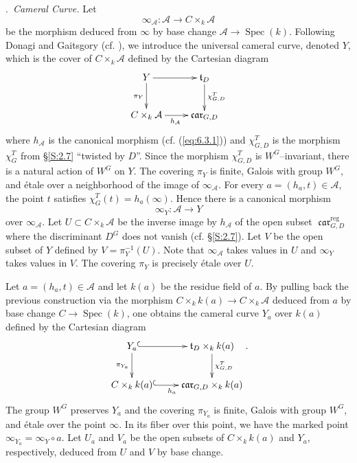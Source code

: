 \documentclass[12pt,a4paper,oneside,english,leqno]{smfart}
\makeatletter
\numberwithin{equation}{subsection}
\numberwithin{theo}{subsection}
\newenvironment{paragr}[1][]{\medskip\refstepcounter{subsection}%
  \par\noindent\hspace*{\parindent}\thesubsection.\ \emph{#1}%
  \@ifundefined{@empty}{}{}\ignorespaces}{\medskip}
\theoremstyle{plain}
\theoremstyle{definition}
\theoremstyle{remark}
\DeclareMathOperator{\reg}{reg}
\DeclareMathOperator{\Spec}{Spec}
\DeclareMathOperator{\car}{\mathfrak{car}}
\newcommand{\Ac}{\mathcal{A}}
\newcommand{\tgo}{\mathfrak{t}}
\makeatother
\begin{document}
\begin{paragr}[Cameral Curve.]\label{S:7.1} Let
$$\infty_\Ac : \Ac \to C\times_k \Ac$$
be the morphism deduced from $\infty$ by base change $\Ac\to \Spec(k)$. Following Donagi and Gaitsgory (cf. \cite{Donagi-Gaitsgory}), we introduce the universal cameral curve, denoted $Y$, which is the cover of $C\times_k \Ac$ defined by the Cartesian diagram
$$\xymatrix{
Y\ar[r]\ar[d]_{\pi_{Y}}&\tgo_{D}\ar[d]^{\chi^T_{G,D}}\\
C\times_k \Ac\ar[r]_{h_{\Ac}}&\car_{G,D}
}$$
where $h_\Ac$ is the canonical morphism (cf. (\ref{eq:6.3.1})) and $\chi^T_{G,D}$ is the morphism $\chi^T_G$ from §\ref{S:2.7} “twisted by $D$”. Since the morphism $\chi^T_{G,D}$ is $W^G$–invariant, there is a natural action of $W^G$ on $Y$. The covering $\pi_Y$ is finite, Galois with group $W^G$, and étale over a neighborhood of the image of $\infty_\Ac$. For every $a=(h_a,t)\in \Ac$, the point $t$ satisfies $\chi_G^T(t)=h_a(\infty)$. Hence there is a canonical morphism
$$\infty_Y : \Ac \to Y$$
over $\infty_\Ac$. Let $U\subset C\times_k \Ac$ be the inverse image by $h_\Ac$ of the open subset $\car_{G,D}^{\reg}$ where the discriminant $D^G$ does not vanish (cf. §\ref{S:2.7}). Let $V$ be the open subset of $Y$ defined by $V=\pi_Y^{-1}(U)$. Note that $\infty_\Ac$ takes values in $U$ and $\infty_Y$ takes values in $V$. The covering $\pi_Y$ is precisely étale over $U$.

Let $a=(h_a,t)\in \Ac$ and let $k(a)$ be the residue field of $a$. By pulling back the previous construction via the morphism $C\times_k k(a)\to C\times_k\Ac$ deduced from $a$ by base change $C\to \Spec(k)$, one obtains the cameral curve $Y_a$ over $k(a)$ defined by the Cartesian diagram
$$\xymatrix{
Y_{a}\ar@{^{(}->}[r]\ar[d]_{\pi_{Y_a}}&\mathfrak{t}_{D}\times_k k(a)
\ar[d]^{\chi^T_{G,D}}\\
C\times_k k(a)\ar@{^{(}->}[r]_{h_{a}}&\mathfrak{car}_{G,D}\times_k k(a)
}.$$
The group $W^G$ preserves $Y_a$ and the covering $\pi_{Y_a}$ is finite, Galois with group $W^G$, and étale over the point $\infty$. In its fiber over this point, we have the marked point $\infty_{Y_a}=\infty_Y\circ a$. Let $U_a$ and $V_a$ be the open subsets of $C\times_k k(a)$ and $Y_a$, respectively, deduced from $U$ and $V$ by base change.
\end{paragr}
\end{document}

